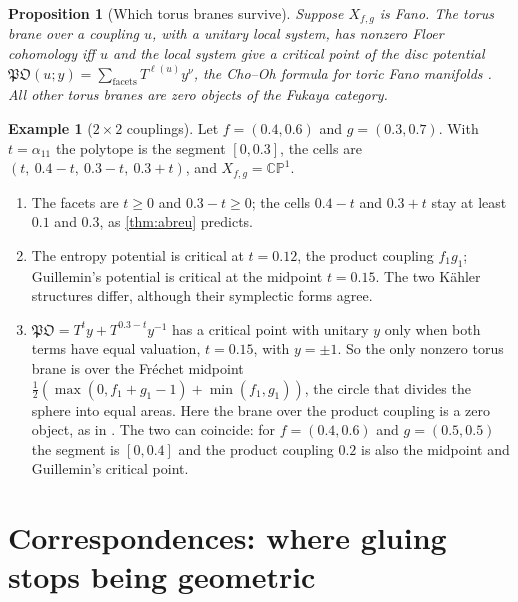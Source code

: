 \documentclass[11pt]{article}
\newtheorem{proposition}[theorem]{Proposition}
\theoremstyle{definition}
\newtheorem{example}[theorem]{Example}
\theoremstyle{remark}
\begin{document}
\begin{proposition}[Which torus branes survive]\label{prop:floer}
Suppose $X_{f,g}$ is Fano. The torus brane over a coupling $u$, with a unitary local system, has nonzero Floer cohomology iff $u$ and the local system give a critical
point of the disc potential $\mathfrak{PO}(u;y)=\sum_{\text{facets}}T^{\ell(u)}y^{\nu}$, the Cho--Oh formula for toric Fano manifolds
\cite{ChoOh2006,FOOO2010}. All other torus branes are zero objects of the Fukaya category.
\end{proposition}

\begin{example}[$2\times2$ couplings]\label{ex:twobytwo}
Let $f=(0.4,0.6)$ and $g=(0.3,0.7)$. With $t=\alpha_{11}$ the polytope is the segment $[0,0.3]$, the cells are
$(t,\ 0.4-t,\ 0.3-t,\ 0.3+t)$, and $X_{f,g}=\mathbb{CP}^1$.
\begin{enumerate}[label=(\roman*)]
\item The facets are $t\ge0$ and $0.3-t\ge0$; the cells $0.4-t$ and $0.3+t$ stay at least $0.1$ and $0.3$, as \cref{thm:abreu} predicts.
\item The entropy potential is critical at $t=0.12$, the product coupling $f_1g_1$; Guillemin's potential is critical at the midpoint
  $t=0.15$. The two Kähler structures differ, although their symplectic forms agree.
\item $\mathfrak{PO}=T^{t}y+T^{0.3-t}y^{-1}$ has a critical point with unitary $y$ only when both terms have equal valuation, $t=0.15$,
  with $y=\pm1$. So the only
  nonzero torus brane is over the Fréchet midpoint $\frac12(\max(0,f_1+g_1-1)+\min(f_1,g_1))$, the circle that divides the sphere into
  equal areas. Here the brane over the product coupling is a zero object, as in \cite[Prop.~10.11]{Conditionals}. The two can
  coincide: for $f=(0.4,0.6)$ and $g=(0.5,0.5)$ the segment is $[0,0.4]$ and the product coupling $0.2$ is also the midpoint and
  Guillemin's critical point.
\end{enumerate}
\end{example}

\section{Correspondences: where gluing stops being geometric}\label{sec:correspondences}
\end{document}
